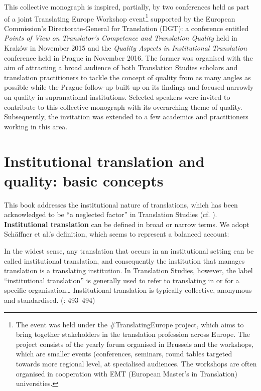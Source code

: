 \documentclass[output=paper]{langsci/langscibook}
\begin{document}
This collective monograph is inspired, partially, by two conferences held as part of a joint Translating Europe Workshop event\footnote{The event was held under the \#TranslatingEurope project, which aims to bring together stakeholders in the translation profession across Europe. The project consists of the yearly forum organised in Brussels and the workshops, which are smaller events (conferences, seminars, round tables targeted towards more regional level, at specialised audiences. The workshops are often organised in cooperation with EMT (European Master's in Translation) universities.} supported by the European Commission’s Directorate-General for Translation (DGT): a conference entitled \textit{Points of View on Translator's Competence and Translation Quality} held in Kraków in  November 2015 and the \textit{Quality Aspects in Institutional Translation} conference held in Prague in  November 2016. The former was organised with the aim of attracting a broad audience of both Translation Studies scholars and translation practitioners to tackle the concept of quality from as many angles as possible while the Prague follow-up built up on its findings and focused narrowly on quality in supranational institutions. Selected speakers were invited to contribute to this collective monograph with its overarching theme of quality. Subsequently, the invitation was extended to a few academics and practitioners working in this area.

\section{Institutional translation and quality: basic concepts}

This book addresses the institutional nature of translations, which has been acknowledged to be “a neglected factor” in Translation Studies (cf. \citealt[470]{Mason20032004}). \textbf{Institutional translation} can be defined in broad or narrow terms. We adopt Schäffner et al.’s definition, which seems to represent a balanced account:

In the widest sense, any translation that occurs in an institutional setting can be called institutional translation, and consequently the institution that manages translation is a translating institution. In Translation Studies, however, the label ``institutional translation'' is generally used to refer to translating in or for a specific organisation… Institutional translation is typically collective, anonymous and standardised. (\citeyear{SchäffnerEtAl2014}: 493–494)
\end{document}
